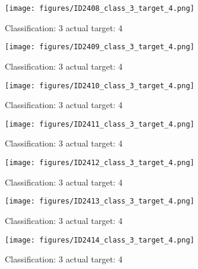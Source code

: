 \begin{figure}[h!]
\begin{center}
\texttt{[image: figures/ID2408\_class\_3\_target\_4.png]}
\end{center}
\caption{ Classification: 3 actual target: 4}
\label{fig:ID2408_class_3_target_4}
\end{figure}
\begin{figure}[h!]
\begin{center}
\texttt{[image: figures/ID2409\_class\_3\_target\_4.png]}
\end{center}
\caption{ Classification: 3 actual target: 4}
\label{fig:ID2409_class_3_target_4}
\end{figure}
\begin{figure}[h!]
\begin{center}
\texttt{[image: figures/ID2410\_class\_3\_target\_4.png]}
\end{center}
\caption{ Classification: 3 actual target: 4}
\label{fig:ID2410_class_3_target_4}
\end{figure}
\begin{figure}[h!]
\begin{center}
\texttt{[image: figures/ID2411\_class\_3\_target\_4.png]}
\end{center}
\caption{ Classification: 3 actual target: 4}
\label{fig:ID2411_class_3_target_4}
\end{figure}
\begin{figure}[h!]
\begin{center}
\texttt{[image: figures/ID2412\_class\_3\_target\_4.png]}
\end{center}
\caption{ Classification: 3 actual target: 4}
\label{fig:ID2412_class_3_target_4}
\end{figure}
\begin{figure}[h!]
\begin{center}
\texttt{[image: figures/ID2413\_class\_3\_target\_4.png]}
\end{center}
\caption{ Classification: 3 actual target: 4}
\label{fig:ID2413_class_3_target_4}
\end{figure}
\begin{figure}[h!]
\begin{center}
\texttt{[image: figures/ID2414\_class\_3\_target\_4.png]}
\end{center}
\caption{ Classification: 3 actual target: 4}
\label{fig:ID2414_class_3_target_4}
\end{figure}
